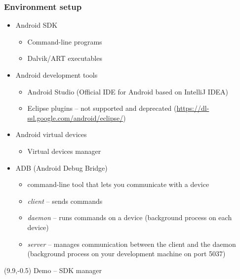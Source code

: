 \documentclass[10pt,xcolor=pdflatex]{beamer}
\newcommand{\radkovani}[1]{\renewcommand{\baselinestretch}{#1}}
\begin{document}
\begin{frame}\frametitle{Environment setup}
	\radkovani{1.2}
	\begin{itemize}
		\item Android SDK
          \begin{itemize}
        	\item Command-line programs
            \item Dalvik/ART executables
          \end{itemize}
		\item Android development tools
          \begin{itemize}
            \item Android Studio (Official IDE for Android based on IntelliJ IDEA)
        	\item Eclipse plugins -- not supported and deprecated (\url{https://dl-ssl.google.com/android/eclipse/})
          \end{itemize}
		\item Android virtual devices
          \begin{itemize}
        	\item Virtual devices manager
          \end{itemize}
        \item ADB (Android Debug Bridge)
          \begin{itemize}
            \item command-line tool that lets you communicate with a device
            \item \emph{client} -- sends commands
            \item \emph{daemon} -- runs commands on a device (background process on each device)
            \item \emph{server} -- manages communication between the client and the daemon (background process on your development machine on port 5037)
          \end{itemize}
	\end{itemize}
    \radkovani{1}
\begin{textblock}{15}(9.9,-0.5)
    {\footnotesize Demo -- SDK manager}
\end{textblock}
\end{frame}
\end{document}
